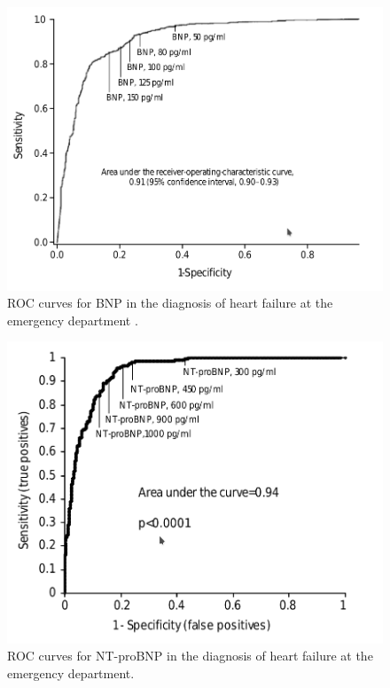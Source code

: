 \documentclass[14pt,a4paper,onecolumn]{extarticle}
\begin{document}
\begin{figure}      \centering      \includegraphics[scale=0.4]{../../images/BNP_ER.png}      \small\caption{ROC curves for BNP in the diagnosis of heart failure at the emergency department \citep{Januzzi2005}.}      \label{BNP_ER}  \end{figure}

\begin{figure}     \centering     \includegraphics[scale=0.4]{../../images/NTBNP_ER.png}     \small\caption{ROC curves for NT-proBNP in the diagnosis of heart failure at the emergency department.\citep{Januzzi2005}}     \label{NTBNP_ER} \end{figure}
\end{document}

